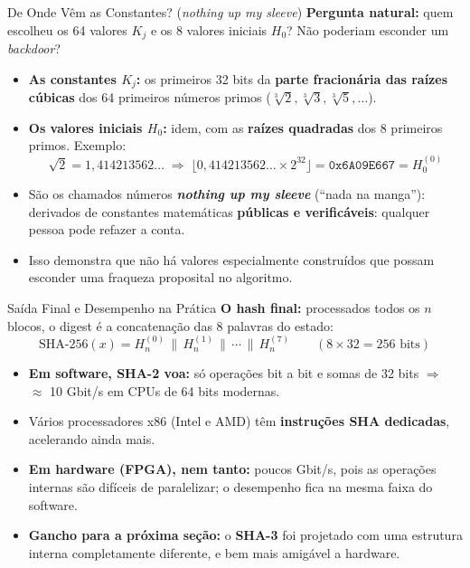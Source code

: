 \documentclass{beamer}
\begin{document}
\begin{frame}{De Onde Vêm as Constantes? (\textit{nothing up my sleeve})}
    \textbf{Pergunta natural:} quem escolheu os 64 valores $K_j$ e os 8 valores iniciais $H_0$? Não poderiam esconder um \textit{backdoor}?
    \medskip
    \begin{itemize}
        \footnotesize
        \item \textbf{As constantes $K_j$:} os primeiros 32 bits da \textbf{parte fracionária das raízes cúbicas} dos 64 primeiros números primos ($\sqrt[3]{2}, \sqrt[3]{3}, \sqrt[3]{5}, \dots$).
        \item \textbf{Os valores iniciais $H_0$:} idem, com as \textbf{raízes quadradas} dos 8 primeiros primos. Exemplo:
        \[
            \sqrt{2} = 1{,}414213562\ldots \;\Rightarrow\; \lfloor 0{,}414213562\ldots \times 2^{32} \rfloor = \texttt{0x6A09E667} = H_0^{(0)}
        \]
    \end{itemize}
    \medskip
    \begin{itemize}
        \footnotesize
        \item São os chamados números \textbf{\textit{nothing up my sleeve}} (``nada na manga''): derivados de constantes matemáticas \textbf{públicas e verificáveis}: qualquer pessoa pode refazer a conta.
        \item Isso demonstra que \alert{não há valores especialmente construídos} que possam esconder uma fraqueza proposital no algoritmo.
    \end{itemize}
\end{frame}

\begin{frame}{Saída Final e Desempenho na Prática}
    \textbf{O hash final:} processados todos os $n$ blocos, o digest é a concatenação das 8 palavras do estado:
    \[
        \text{SHA-256}(x) = H_n^{(0)} \,\|\, H_n^{(1)} \,\|\, \cdots \,\|\, H_n^{(7)} \qquad (8 \times 32 = 256 \text{ bits})
    \]
    \medskip
    \begin{itemize}
        \footnotesize
        \item \textbf{Em software, SHA-2 voa:} só operações bit a bit e somas de 32 bits $\Rightarrow$ $\approx$ 10 Gbit/s em CPUs de 64 bits modernas.
        \item Vários processadores x86 (Intel e AMD) têm \textbf{instruções SHA dedicadas}, acelerando ainda mais.
        \item \textbf{Em hardware (FPGA), nem tanto:} poucos Gbit/s, pois as operações internas são difíceis de paralelizar; o desempenho fica na mesma faixa do software.
    \end{itemize}
    \medskip
    \begin{itemize}
        \footnotesize
        \item<2-> \textbf{Gancho para a próxima seção:} o \textbf{SHA-3} foi projetado com uma estrutura interna completamente diferente, e bem mais amigável a hardware.
    \end{itemize}
\end{frame}
\end{document}
